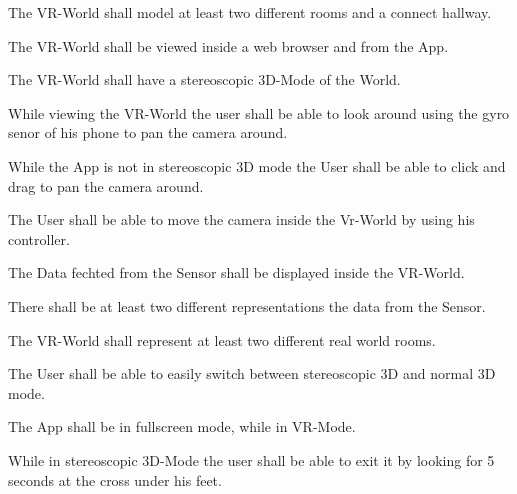   \begin{description}
    \item The VR-World shall model at least two different rooms and a connect hallway.
    \item The VR-World shall be viewed inside a web browser and from the App.
    \item The VR-World shall have a stereoscopic 3D-Mode of the World.
    \item While viewing the VR-World the user shall be able to look around using the gyro senor of his phone to pan the camera around.
    \item While the App is not in stereoscopic 3D mode the User shall be able to click and drag to pan the camera around.
    \item The User shall be able to move the camera inside the Vr-World by using his controller.
    \item The Data fechted from the Sensor shall be displayed inside the VR-World.
    \item There shall be at least two different representations the data from the Sensor.
    \item The VR-World shall represent at least two different real world rooms.
    \item The User shall be able to easily switch between stereoscopic 3D and normal 3D mode.
    \item The App shall be in fullscreen mode, while in VR-Mode.
    \item While in stereoscopic 3D-Mode the user shall be able to exit it by looking for 5 seconds at the cross under his feet.
  \end{description}
